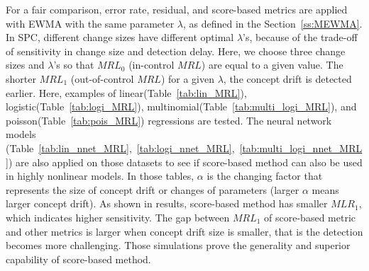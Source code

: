 \documentclass[twoside,11pt]{article}
\begin{document}
For a fair comparison, error rate, residual, and score-based metrics are applied with EWMA with the same parameter $\lambda$, as defined in the Section~\ref{ss:MEWMA}. In SPC, different change sizes have different optimal $ \lambda$'s, because of the trade-off of sensitivity in change size and detection delay. Here, we choose three change sizes and $ \lambda$'s so that $MRL_0$ (in-control $MRL$) are equal to a given value. The shorter $MRL_1$ (out-of-control $MRL$) for a given $ \lambda$, the concept drift is detected earlier. Here, examples of linear(Table~\ref{tab:lin_MRL}), logistic(Table~\ref{tab:logi_MRL}), multinomial(Table~\ref{tab:multi_logi_MRL}), and poisson(Table~\ref{tab:pois_MRL}) regressions are tested. The neural network models (Table~\ref{tab:lin_nnet_MRL},~\ref{tab:logi_nnet_MRL},~\ref{tab:multi_logi_nnet_MRL}) are also applied on those datasets to see if score-based method can also be used in highly nonlinear models. In those tables, $ \alpha$ is the changing factor that represents the size of concept drift or changes of parameters (larger $ \alpha$ means larger concept drift). As shown in results, score-based method has smaller $MLR_1$, which indicates higher sensitivity. The gap between $MRL_1$ of score-based metric and other metrics is larger when concept drift size is smaller, that is the detection becomes more challenging. Those simulations prove the generality and superior capability of score-based method.
\end{document}
